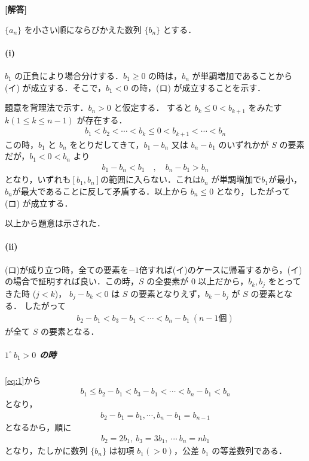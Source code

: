 \documentclass[../../main.tex]{subfiles}
\begin{document}
\begin{oframed}
  
\end{oframed}

{\bf [解答]}

$\{a_n\}$ を小さい順にならびかえた数列 $\{b_n\}$ とする．

\paragraph{(i)}

$b_1$ の正負により場合分けする．$b_1 \ge 0$ の時は，$b_n$ が単調増加であることから (イ) が成立する．そこで，$b_1 < 0$ の時，(ロ) が成立することを示す．

題意を背理法で示す．$b_n > 0$ と仮定する．
すると $b_k \le 0 < b_{k+1}$ をみたす $k (1 \le k \le n-1)$ が存在する．
\begin{align}
  b_1 < b_2 < \cdots < b_k \le 0 < b_{k+1} < \cdots < b_n
\end{align}
この時，$b_1$ と $b_n$ をとりだしてきて，$b_1-b_n$ 又は $b_n-b_1$ のいずれかが $S$ の要素だが，$b_1 < 0 < b_n$ より
\begin{align}
  b_1 - b_n < b_1 \quad, \quad b_n - b_1 > b_n
\end{align}
となり，いずれも$[b_1,b_n]$の範囲に入らない．これは$b_n$ が単調増加で$b_1$が最小，$b_n$が最大であることに反して矛盾する．以上から $b_n \le 0$ となり，したがって (ロ) が成立する．

以上から題意は示された．

\paragraph{(ii)}

(ロ)が成り立つ時，全ての要素を$-1$倍すれば(イ)のケースに帰着するから，(イ)の場合で証明すれば良い．この時，$S$ の全要素が $0$ 以上だから，$b_k, b_j$ をとってきた時 ($j<k$)，
$b_j - b_k < 0$ は $S$ の要素となりえず，$b_k - b_j$ が $S$ の要素となる．
したがって
\begin{align}
  b_2 - b_1 < b_3 - b_1 < \cdots < b_n - b_1 \ (n-1\text{個}) \label{eq:1}
\end{align}
が全て $S$ の要素となる．

\subparagraph{$1^{\circ} \ b_1 > 0$ の時}

\cref{eq:1}から
\begin{align}
  b_1 \le b_2 - b_1 < b_3 - b_1 < \cdots < b_n - b_1 < b_n
\end{align}
となり，
\begin{align}
  b_2 - b_1 = b_1, \cdots, b_n - b_1 = b_{n-1}
\end{align}
となるから，順に
\begin{align}
  b_2 = 2b_1, \ b_3 = 3b_1, \ \cdots \ b_n = nb_1
\end{align}
となり，たしかに数列 $\{b_n\}$ は初項 $b_1(>0)$，公差 $b_1$ の等差数列である．
\end{document}
